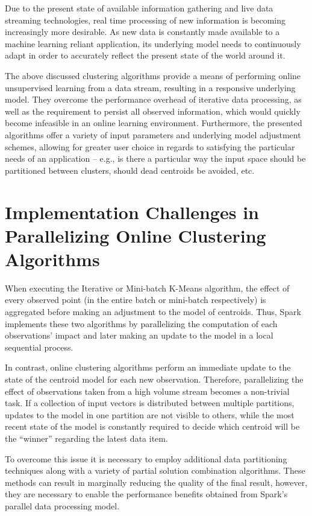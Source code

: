 \documentclass{l4proj}
\begin{document}
Due to the present state of available information gathering and live data streaming technologies, real time processing of new information is becoming increasingly more desirable. As new data is constantly made available to a machine learning reliant application, its underlying model needs to continuously adapt in order to accurately reflect the present state of the world around it.

The above discussed clustering algorithms provide a means of performing online unsupervised learning from a data stream, resulting in a responsive underlying model. They overcome the performance overhead of iterative data processing, as well as the requirement to persist all observed information, which would quickly become infeasible in an online learning environment. Furthermore, the presented algorithms offer a variety of input parameters and underlying model adjustment schemes, allowing for greater user choice in regards to satisfying the particular needs of an application -- e.g., is there a particular way the input space should be partitioned between clusters, should dead centroids be avoided, etc. 

\section{Implementation Challenges in Parallelizing Online Clustering Algorithms}

When executing the Iterative or Mini-batch K-Means algorithm, the effect of every observed point (in the entire batch or mini-batch respectively) is aggregated before making an adjustment to the model of centroids. Thus, Spark implements these two algorithms by parallelizing the computation of each observations' impact and later making an update to the model in a local sequential process.

In contrast, online clustering algorithms perform an immediate update to the state of the centroid model for each new observation. Therefore, parallelizing the effect of observations taken from a high volume stream becomes a non-trivial task. If a collection of input vectors is distributed between multiple partitions, updates to the model in one partition are not visible to others, while the most recent state of the model is constantly required to decide which centroid will be the ``winner'' regarding the latest data item.

To overcome this issue it is necessary to employ additional data partitioning techniques along with a variety of partial solution combination algorithms. These methods can result in marginally reducing the quality of the final result, however, they are necessary to enable the performance benefits obtained from Spark's parallel data processing model.
\end{document}
